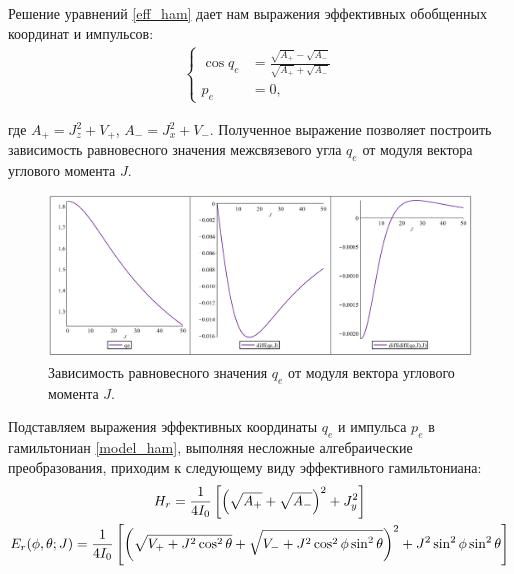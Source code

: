 Решение уравнений \eqref{eff_ham} дает нам выражения эффективных обобщенных координат и импульсов:
\begin{gather}
\left\{
\begin{aligned}
\cos q_e &= \frac{\sqrt{A_{+}} - \sqrt{A_{-}}}{\sqrt{A_{+}} + \sqrt{A_{-}}} \\
p_e &= 0,
\end{aligned}
\right.
\end{gather}

\vlevo где $A_{+} = J_z^2 + V_{+}$, $A_{-} = J_x^2 + V_{-}$. 
Полученное выражение позволяет построить зависимость равновесного значения межсвязевого угла $q_e$ от модуля вектора углового момента $J$. 
\vverh
\begin{figure}[!ht]
  \centering
	\includegraphics[width=\textwidth]{../pictures/qe_rigid.png}
	\caption{Зависимость равновесного значения $q_e$ от модуля вектора углового момента $J$.}
	\label{fig:qe}
\end{figure}

Подставляем выражения эффективных координаты $q_e$ и импульса $p_e$ в гамильтониан \eqref{model_ham}, выполняя несложные алгебраические преобразования, приходим к следующему виду эффективного гамильтониана:
\vverh
\begin{gather}
H_r = \frac{1}{4I_0} \left[ \left( \sqrt{A_{+}} + \sqrt{A_{-}} \right)^2 + J_y^2 \right] \notag \\
E_r (\phi, \theta; J) = \frac{1}{4I_0} \left[ \left( \sqrt{V_{+} + J^2 \cos^2 \theta} + \sqrt{V_{-} + J^2 \cos^2 \phi \sin^2 \theta} \right)^2 + J^2 \sin^2 \phi \sin^2 \theta \right] \notag
\end{gather}

